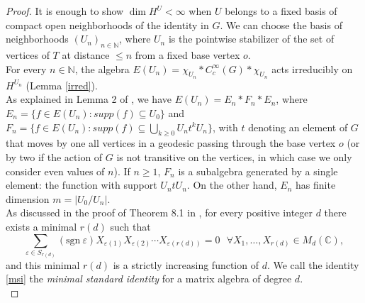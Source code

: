 \documentclass{article}
\theoremstyle{definition}
\theoremstyle{remark}
\theoremstyle{plain}
\begin{document}
\begin{proof}
    It is enough to show $\dim{H^U}<\infty$ when $U$ belongs to a fixed basis of compact open neighborhoods of the identity in $G$. We can choose the basis of neighborhoods $(U_n)_{n\in\mathbb{N}}$, where $U_n$ is the pointwise stabilizer of the set of vertices of $T$ at distance $\leq n$ from a fixed base vertex $o$. \\

    For every $n\in\mathbb{N}$, the algebra $E(U_n)=\chi_{U_n} * C_c^\infty(G) * \chi_{U_n}$ acts irreducibly on $H^{U_n}$ (Lemma \ref{irred}). \\
    
    As explained in Lemma 2 of \cite{olsh2}, we have $E(U_n)=E_n * F_n * E_n$, where $E_n=\{f\in E(U_n): supp(f)\subseteq U_0\}$ and $F_n=\{f\in E(U_n): supp(f)\subseteq\bigcup_{k\geq0}{U_n t^k U_n}\}$, with $t$ denoting an element of $G$ that moves by one all vertices in a geodesic passing through the base vertex $o$ (or by two if the action of $G$ is not transitive on the vertices, in which case we only consider even values of $n$). If $n\geq 1$, $F_n$ is a subalgebra generated by a single element: the function with support $U_n t U_n$. On the other hand, $E_n$ has finite dimension $m=|U_0/U_n|$. \\

    As discussed in the proof of Theorem 8.1 in \cite{knapp2}, for every positive integer $d$ there exists a minimal $r(d)$ such that
    \begin{equation} \label{msi}
        \sum_{\varepsilon\in S_{r(d)}}{(\mathrm{sgn}\ \varepsilon)X_{\varepsilon(1)}X_{\varepsilon(2)}\cdots X_{\varepsilon(r(d))}}=0 \ \ \ \forall X_1,\ldots,X_{r(d)}\in M_d(\mathbb{C}),
    \end{equation}
    and this minimal $r(d)$ is a strictly increasing function of $d$. We call the identity \eqref{msi} the \textit{minimal standard identity} for a matrix algebra of degree $d$. \\
    

\end{proof}
\end{document}
